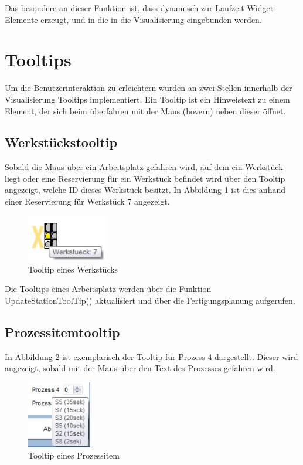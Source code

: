 Das besondere an dieser Funktion ist, dass dynamisch zur Laufzeit Widget-Elemente erzeugt, und in die in die Visualisierung eingebunden werden. 

\section{Tooltips}
\label{sec:tooltips}

Um die Benutzerinteraktion zu erleichtern wurden an zwei Stellen innerhalb der Visualisierung Tooltips implementiert. Ein Tooltip ist ein Hinweistext zu einem Element, der sich beim überfahren mit der Maus (hovern) neben dieser öffnet. 

\subsection{Werkstückstooltip}

Sobald die Maus über ein Arbeitsplatz gefahren wird, auf dem ein Werkstück liegt oder eine Reservierung für ein Werkstück befindet wird über den Tooltip angezeigt, welche ID dieses Werkstück besitzt. In Abbildung \ref{fig:Stationstooltip} ist dies anhand einer Reservierung für Werkstück 7 angezeigt. 

\begin{figure}[htb]
    \centering
    \includegraphics[width=0.31\textwidth]{Abbildungen/Werkstueckhover.png}
    \caption{Tooltip eines Werkstücks}		
    \label{fig:Stationstooltip}
\end{figure}

Die Tooltips eines Arbeitsplatz werden über die Funktion UpdateStationToolTip() aktualisiert und über die Fertigungsplanung aufgerufen. 

\subsection{Prozessitemtooltip}

In Abbildung \ref{fig:Prozessitemtooltip} ist exemplarisch der Tooltip für Prozess 4 dargestellt. Dieser wird angezeigt, sobald mit der Maus über den Text des Prozesses gefahren wird. 

\begin{figure}[htb]
    \centering
    \includegraphics[width=0.25\textwidth]{Abbildungen/Prozesshover.png}
    \caption{Tooltip eines Prozessitem}		
    \label{fig:Prozessitemtooltip}
\end{figure}


